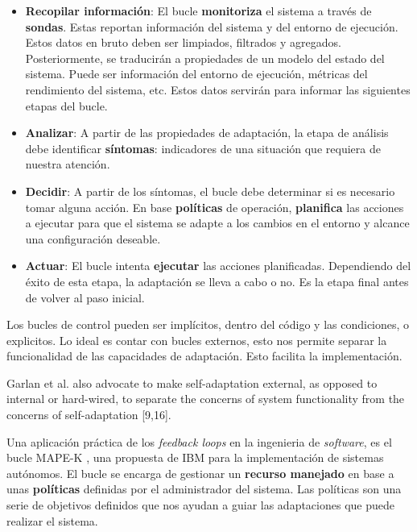 \begin{itemize}
  \item \textbf{Recopilar información}: El bucle \textbf{monitoriza} el sistema a través de \textbf{sondas}. Estas reportan información del sistema y del entorno de ejecución. Estos datos en bruto deben ser limpiados, filtrados y agregados. Posteriormente, se traducirán a propiedades de un modelo del estado del sistema.  Puede ser información del entorno de ejecución, métricas del rendimiento del sistema, etc. Estos datos servirán para informar las siguientes etapas del bucle.

  \item \textbf{Analizar}: A partir de las propiedades de adaptación, la etapa de análisis debe identificar \textbf{síntomas}: indicadores de una situación que requiera de nuestra atención.

  \item \textbf{Decidir}: A partir de los síntomas, el bucle debe determinar si es necesario tomar alguna acción. En base \textbf{políticas} de operación, \textbf{planifica} las acciones a ejecutar para que el sistema se adapte a los cambios en el entorno y alcance una configuración deseable.

  \item \textbf{Actuar}: El bucle intenta \textbf{ejecutar} las acciones planificadas. Dependiendo del éxito de esta etapa, la adaptación se lleva a cabo o no. Es la etapa final antes de volver al paso inicial.
\end{itemize}

Los bucles de control pueden ser implícitos, dentro del código y las condiciones, o explicitos. Lo ideal es contar con bucles externos, esto nos permite separar la funcionalidad de las capacidades de adaptación. Esto facilita la implementación.

Garlan et al. also advocate to make self-adaptation external, as opposed to internal or hard-wired, to separate the concerns of system
functionality from the concerns of self-adaptation [9,16].

Una aplicación práctica de los \emph{feedback loops} en la ingenieria de \emph{software}, es el bucle MAPE-K \cite{ArchitecturalBlueprintAutonomic2006, fonsServiciosAdaptivereadyPara2021}, una propuesta de IBM para la implementación de sistemas autónomos. El bucle se encarga de gestionar un \textbf{recurso manejado} en base a unas \textbf{políticas} definidas por el administrador del sistema. Las políticas son una serie de objetivos definidos que nos ayudan a guiar las adaptaciones que puede realizar el sistema.

